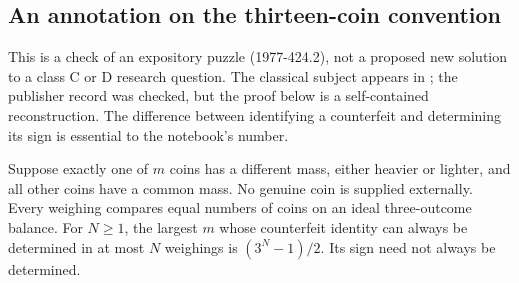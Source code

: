 \subsection{An annotation on the thirteen-coin convention}

This is a check of an expository puzzle (1977-424.2), not a proposed new
solution to a class C or D research question.  The classical subject appears
in \citet{dyson1946pennies}; the publisher record was checked, but the proof
below is a self-contained reconstruction.  The difference between identifying
a counterfeit and determining its sign is essential to the notebook's number.

\begin{proposition}\ours{}
Suppose exactly one of \(m\) coins has a different mass, either heavier or
lighter, and all other coins have a common mass.  No genuine coin is supplied
externally.  Every weighing compares equal numbers of coins on an ideal
three-outcome balance.  For \(N\geq1\), the largest \(m\) whose counterfeit
identity can always be determined in at most \(N\) weighings is
\((3^N-1)/2\).  Its sign need not always be determined.
\end{proposition}

